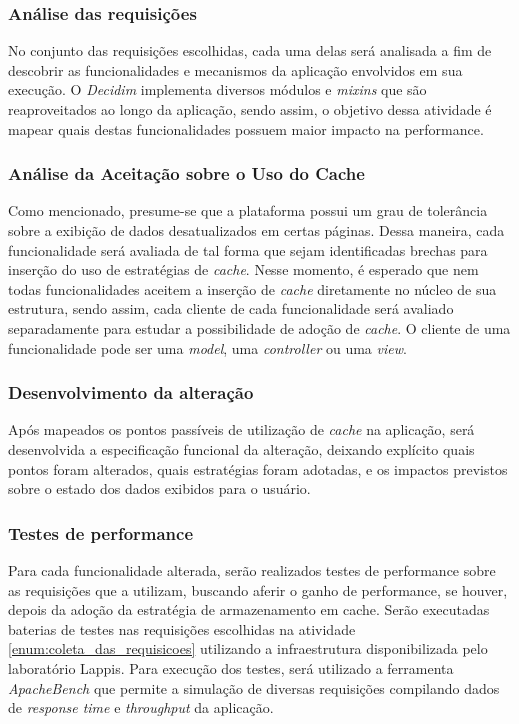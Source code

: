 \subsubsection{Análise das requisições}

No conjunto das requisições escolhidas, cada uma delas será analisada a fim de descobrir as funcionalidades e mecanismos da aplicação envolvidos em sua execução. O \textit{Decidim} implementa diversos módulos e \textit{mixins} que são reaproveitados ao longo da aplicação, sendo assim, o objetivo dessa atividade é mapear quais destas funcionalidades possuem maior impacto na performance.

\subsubsection{Análise da Aceitação sobre o Uso do Cache}

Como mencionado, presume-se que a plataforma possui um grau de tolerância sobre a exibição de dados desatualizados em certas páginas. Dessa maneira, cada funcionalidade será avaliada de tal forma que sejam identificadas brechas para inserção do uso de estratégias de \textit{cache}. Nesse momento, é esperado que nem todas funcionalidades aceitem a inserção de \textit{cache} diretamente no núcleo de sua estrutura, sendo assim, cada cliente de cada funcionalidade será avaliado separadamente para estudar a possibilidade de adoção de \textit{cache}. O cliente de uma funcionalidade pode ser uma \textit{model}, uma \textit{controller} ou uma \textit{view}.

\subsubsection{Desenvolvimento da alteração}

Após mapeados os pontos passíveis de utilização de \textit{cache} na aplicação, será desenvolvida a especificação funcional da alteração, deixando explícito quais pontos foram alterados, quais estratégias foram adotadas, e os impactos previstos sobre o estado dos dados exibidos para o usuário.

\subsubsection{Testes de performance}

Para cada funcionalidade alterada, serão realizados testes de performance sobre as requisições que a utilizam, buscando aferir o ganho de performance, se houver, depois da adoção da estratégia de armazenamento em cache. Serão executadas baterias de testes nas requisições escolhidas na atividade \ref{enum:coleta_das_requisicoes} utilizando a infraestrutura disponibilizada pelo laboratório Lappis. Para execução dos testes, será utilizado a ferramenta \textit{ApacheBench} que permite a simulação de diversas requisições compilando dados de \textit{response time} e \textit{throughput} da aplicação.

